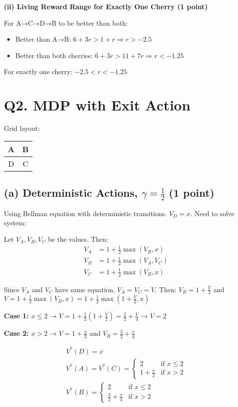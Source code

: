 \documentclass[11pt]{article}
\begin{document}
\textbf{(ii) Living Reward Range for Exactly One Cherry (1 point)}

For A→C→D→B to be better than both:
\begin{itemize}
\item Better than A→B: $6 + 3r > 1 + r \Rightarrow r > -2.5$
\item Better than both cherries: $6 + 3r > 11 + 7r \Rightarrow r < -1.25$
\end{itemize}

For exactly one cherry: $\boxed{-2.5 < r < -1.25}$

\section{Q2. MDP with Exit Action}

Grid layout:
\begin{center}
\begin{tabular}{|c|c|}
\hline
A & B \\
\hline
D & C \\
\hline
\end{tabular}
\end{center}

\subsection{(a) Deterministic Actions, $\gamma = \frac{1}{2}$ (1 point)}

Using Bellman equation with deterministic transitions. $V_D = x$. Need to solve system:

Let $V_A, V_B, V_C$ be the values. Then:
\begin{align*}
V_A &= 1 + \frac{1}{2}\max(V_B, x) \\
V_B &= 1 + \frac{1}{2}\max(V_A, V_C) \\
V_C &= 1 + \frac{1}{2}\max(V_B, x)
\end{align*}

Since $V_A$ and $V_C$ have same equation, $V_A = V_C = V$. Then:
$V_B = 1 + \frac{V}{2}$ and $V = 1 + \frac{1}{2}\max(V_B, x) = 1 + \frac{1}{2}\max(1 + \frac{V}{2}, x)$

\textbf{Case 1: $x \leq 2$} → $V = 1 + \frac{1}{2}(1 + \frac{V}{2}) = \frac{3}{2} + \frac{V}{4}$ → $V = 2$

\textbf{Case 2: $x > 2$} → $V = 1 + \frac{x}{2}$ and $V_B = \frac{3}{2} + \frac{x}{4}$

\begin{align}
\boxed{V^*(D) = x} \\
\boxed{V^*(A) = V^*(C) = \begin{cases} 2 & \text{if } x \leq 2 \\ 1 + \frac{x}{2} & \text{if } x > 2 \end{cases}} \\
\boxed{V^*(B) = \begin{cases} 2 & \text{if } x \leq 2 \\ \frac{3}{2} + \frac{x}{4} & \text{if } x > 2 \end{cases}}
\end{align}
\end{document}
